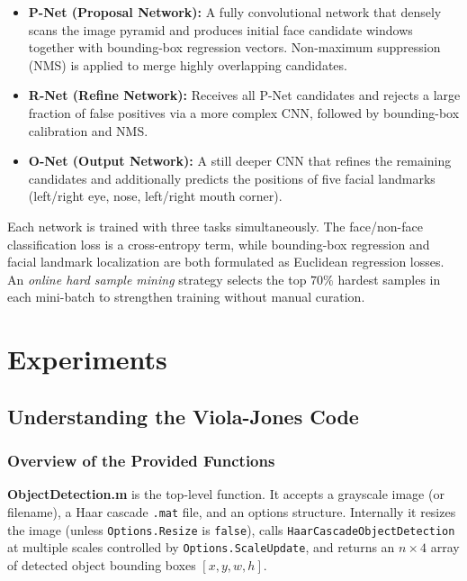 \documentclass{article}
\begin{document}
\begin{itemize}
    \item \textbf{P-Net (Proposal Network):} A fully convolutional
    network that densely scans the image pyramid and produces initial
    face candidate windows together with bounding-box regression
    vectors. Non-maximum suppression (NMS) is applied to merge
    highly overlapping candidates.

    \item \textbf{R-Net (Refine Network):} Receives all P-Net
    candidates and rejects a large fraction of false positives via
    a more complex CNN, followed by bounding-box calibration and NMS.

    \item \textbf{O-Net (Output Network):} A still deeper CNN that
    refines the remaining candidates and additionally predicts the
    positions of five facial landmarks (left/right eye, nose,
    left/right mouth corner).
\end{itemize}

Each network is trained with three tasks simultaneously. The
face/non-face classification loss is a cross-entropy term, while
bounding-box regression and facial landmark localization are both
formulated as Euclidean regression losses.
An \emph{online hard sample mining} strategy selects the top $70\%$
hardest samples in each mini-batch to strengthen training without
manual curation.

\section{Experiments}
\label{sec:Experiments}

\subsection{Understanding the Viola-Jones Code}

\subsubsection{Overview of the Provided Functions}

\textbf{ObjectDetection.m} is the top-level function. It accepts a
grayscale image (or filename), a Haar cascade \texttt{.mat} file, and
an options structure. Internally it resizes the image (unless
\texttt{Options.Resize} is \texttt{false}), calls
\texttt{HaarCascadeObjectDetection} at multiple scales controlled by
\texttt{Options.ScaleUpdate}, and returns an $n\times 4$ array of
detected object bounding boxes $[x, y, w, h]$.
\end{document}
